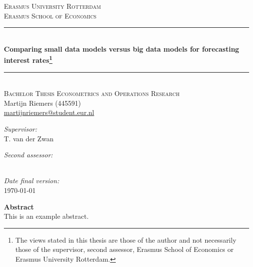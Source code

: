 \begin{titlepage}
	\thispagestyle{empty}
	
	\begin{center}
		\textsc{\Large{Erasmus University Rotterdam}}\\[.7cm]
		\textsc{Erasmus School of Economics}\\[0.5cm]
		
		\rule{\linewidth}{0.5mm} \\[0.4cm]
		\huge{\bfseries{Comparing small data models versus big data models for forecasting interest rates\footnote{The views stated in this thesis are those of the author and not necessarily those of the supervisor, second assessor, Erasmus School of Economics or Erasmus University Rotterdam.}}} \\
		\rule{\linewidth}{0.5mm} \\[.5cm]
		
		\textsc{\large{Bachelor Thesis Econometrics and Operations Research}} \\[.5cm]
		
		\large{Martijn Riemers (445591)} \\
		\large{\href{mailto:martijnriemers@student.eur.nl}{martijnriemers@student.eur.nl}} \\[.75cm]	
		
		\begin{minipage}[t]{0.4\textwidth}
		\center
		\large{\emph{Supervisor:}}\\
		\large{T. van der Zwan}
		\end{minipage}
		\begin{minipage}[t]{0.4\textwidth}
		\center
		\large{\emph{Second assessor:}} \\
		\end{minipage}\\[.75cm]
		
		\large{\emph{Date final version:}} \\
		\large{\today} \\[4cm]
	\end{center}
	
	\large{\textbf{Abstract}} \\
	This is an example abstract.
\end{titlepage}